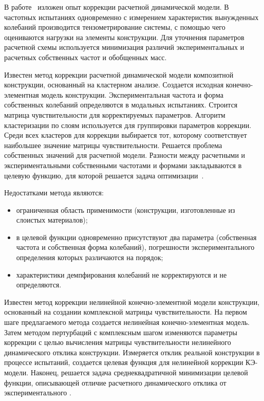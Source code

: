 В работе~\cite{lib:modelUpdating:Kuznetsov} изложен опыт коррекции расчетной динамической модели. В частотных испытаниях одновременно с измерением характеристик вынужденных колебаний производится тензометрирование системы, с помощью чего оцениваются нагрузки на элементы конструкции. Для уточнения параметров расчетной схемы используется минимизация различий экспериментальных и расчетных собственных частот и обобщенных масс.

Известен метод коррекции расчетной динамической модели композитной конструкции, основанный на кластерном анализе. Создается исходная конечно-элементная модель конструкции. Экспериментальная частота и форма собственных колебаний определяются в модальных испытаниях. Строится матрица чувствительности для корректируемых параметров. Алгоритм кластеризации по слоям используется для группировки параметров коррекции. Среди всех кластеров для коррекции выбирается тот, которому соответствует наибольшее значение матрицы чувствительности. Решается проблема собственных значений для расчетной модели. Разности между расчетными и экспериментальными собственными частотами и формами закладываются в целевую функцию, для которой решается задача оптимизации~\cite{lib:modelUpdating:CN107357992A}.

Недостатками метода являются: 
\begin{itemize}
	\item ограниченная область применимости (конструкции, изготовленные из слоистых материалов); 
	\item в целевой функции одновременно присутствуют два параметра (собственная частота и собственная форма колебаний), погрешности экспериментального определения которых различаются на порядок; 
	\item характеристики демпфирования колебаний не корректируются и не определяются. 
\end{itemize}

Известен метод коррекции нелинейной конечно-элементной модели конструкции, основанный на создании комплексной матрицы чувствительности. На первом шаге предлагаемого метода создается нелинейная конечно-элементная модель. Затем методом пертурбаций с комплексным шагом изменяются параметры коррекции с целью вычисления матрицы чувствительности нелинейного динамического отклика конструкции. Измеряется отклик реальной конструкции в процессе испытаний, создается целевая функция для нелинейной коррекции КЭ-модели. Наконец, решается задача среднеквадратичной минимизации целевой функции, описывающей отличие расчетного динамического отклика от экспериментального \cite{lib:modelUpdating:CN109885896A}. 

